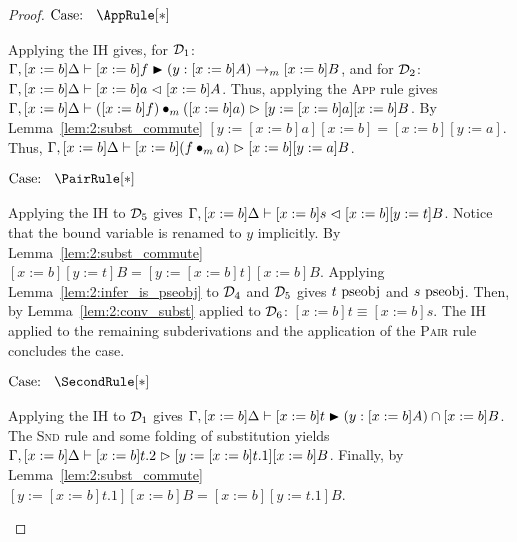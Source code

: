 \begin{proof}
    $\text{Case: }\begin{array}{c} \AppRule[*] \end{array}$
    \begin{proofcase}
        Applying the IH gives, for $\mathcal{D}_{1}$: $\Gamma, [x := b]\Delta \vdash [x := b]f \blacktriangleright (y : [x := b]A) \to_m [x := b]B$, and for $\mathcal{D}_{2}$: $\Gamma, [x := b]\Delta \vdash [x := b]a \vartriangleleft [x := b]A$.
        Thus, applying the \textsc{App} rule gives $\Gamma, [x := b]\Delta \vdash ([x := b]f) \bullet_{m} ([x := b]a) \vartriangleright [y := [x := b]a][x := b]B$.
        By Lemma~\ref{lem:2:subst_commute} $[y := [x := b]a][x := b] = [x := b][y := a]$.
        Thus, $\Gamma, [x := b]\Delta \vdash [x := b](f \bullet_{m} a) \vartriangleright [x := b][y := a]B$.
    \end{proofcase}

    $\text{Case: }\begin{array}{c} \PairRule[*] \end{array}$
    \begin{proofcase}
        Applying the IH to $\mathcal{D}_{5}$ gives $\Gamma, [x := b]\Delta \vdash [x := b]s \vartriangleleft [x := b][y := t]B$.
        Notice that the bound variable is renamed to $y$ implicitly.
        By Lemma~\ref{lem:2:subst_commute} $[x := b][y := t]B = [y := [x := b]t][x := b]B$.
        Applying Lemma~\ref{lem:2:infer_is_pseobj} to $\mathcal{D}_{4}$ and $\mathcal{D}_{5}$ gives $t~\mbox{\normalfont pseobj}$ and $s~\mbox{\normalfont pseobj}$.
        Then, by Lemma~\ref{lem:2:conv_subst} applied to $\mathcal{D}_{6}$: $[x := b]t \equiv [x := b]s$.
        The IH applied to the remaining subderivations and the application of the \textsc{Pair} rule concludes the case.
    \end{proofcase}

    $\text{Case: }\begin{array}{c} \SecondRule[*] \end{array}$
    \begin{proofcase}
        Applying the IH to $\mathcal{D}_{1}$ gives $\Gamma, [x := b]\Delta \vdash [x := b]t \blacktriangleright (y : [x := b]A) \cap [x := b]B$.
        The \textsc{Snd} rule and some folding of substitution yields $\Gamma, [x := b]\Delta \vdash [x := b]t.2 \vartriangleright [y := [x := b]t.1][x := b]B$.
        Finally, by Lemma~\ref{lem:2:subst_commute} $[y := [x := b]t.1][x := b]B = [x := b][y := t.1]B$.
    \end{proofcase}


\end{proof}
